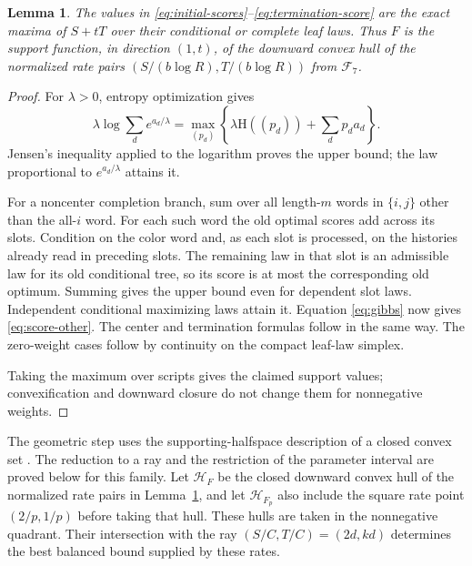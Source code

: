 \documentclass[11pt]{article}
\numberwithin{equation}{section}
\newtheorem{lemma}[theorem]{Lemma}
\theoremstyle{definition}
\theoremstyle{remark}
\begin{document}
\begin{lemma}\label{lem:score-optimality}
The values in \eqref{eq:initial-scores}--\eqref{eq:termination-score}
are the exact maxima of \(S+tT\) over their conditional or complete
leaf laws.  Thus \(F\) is the support function, in direction \((1,t)\),
of the downward convex hull of the normalized rate pairs
\((S/(b\log R),T/(b\log R))\) from \(\mathcal F_7\).
\end{lemma}

\begin{proof}
For \(\lambda>0\), entropy optimization gives
\begin{equation}\label{eq:gibbs}
 \lambda\log\sum_d e^{a_d/\lambda}
  =\max_{(p_d)}
     \left\{\lambda\mathrm H((p_d))+\sum_d p_d a_d\right\}.
\end{equation}
Jensen's inequality applied to the logarithm proves the upper bound;
the law proportional to \(e^{a_d/\lambda}\) attains it.

For a noncenter completion branch, sum over all length-\(m\)
words in \(\{i,j\}\) other than the all-\(i\) word.
For each such word the old optimal scores add across its slots.
Condition on the color word and, as each slot is processed, on the
histories already read in preceding slots.  The remaining law in
that slot is an admissible law for its old conditional tree, so its
score is at most the corresponding old optimum.  Summing gives the
upper bound even for dependent slot laws.  Independent conditional
maximizing laws attain it.
Equation \eqref{eq:gibbs} now gives \eqref{eq:score-other}.
The center and termination formulas follow in the same way.
The zero-weight cases follow by continuity on the compact leaf-law
simplex.

Taking the maximum over scripts gives the claimed support values;
convexification and downward closure do not change them for
nonnegative weights.
\end{proof}

The geometric step uses the supporting-halfspace description of a
closed convex set \cite[Theorem~8.24]{rockafellar-wets}.  The reduction
to a ray and the restriction of the parameter interval are proved
below for this family.  Let \(\mathcal H_F\) be the closed downward convex
hull of the normalized rate pairs in Lemma~\ref{lem:score-optimality},
and let \(\mathcal H_{F_p}\) also include the square rate point
\((2/p,1/p)\) before taking that hull.  These hulls are taken in the
nonnegative quadrant.  Their intersection with the ray
\((S/C,T/C)=(2d,kd)\) determines the best balanced bound supplied by
these rates.
\end{document}
